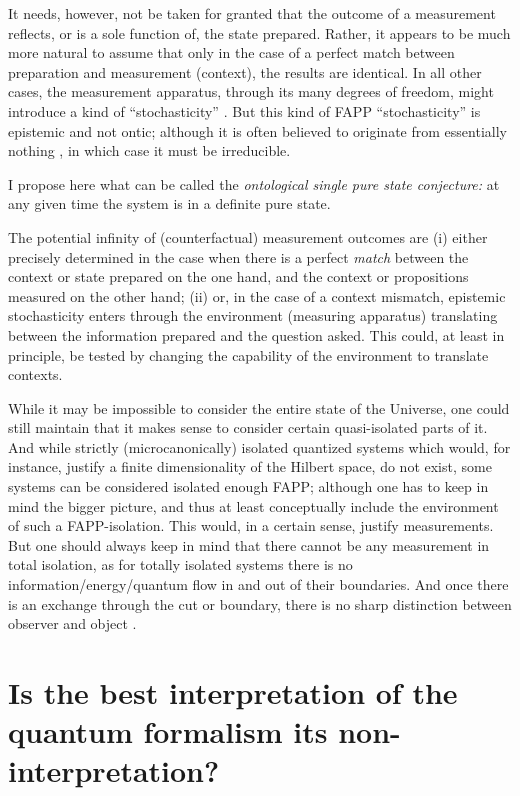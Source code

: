 \documentclass[%
 preprint,
 showpacs,
 showkeys,
 preprintnumbers,
 amsmath,amssymb,
 aps,
  pra,
  longbibliography,
 ]{revtex4-1}
\begin{document}
It needs, however, not be taken for granted that the outcome of a measurement
reflects, or is a sole function of, the state prepared.
Rather, it appears to be much more natural to assume that only in the case of a
perfect match between preparation and measurement (context), the results are identical.
In all other cases, the measurement apparatus, through its many degrees of freedom,
might introduce a kind of ``stochasticity''
\cite{svozil-2003-garda,svozil-2011-jesuitlies}.
But this kind of FAPP ``stochasticity'' is epistemic and not ontic;
although it is often believed to originate from
essentially nothing \cite{zeil-99,zeil-05_nature_ofQuantum}, in which case it must be irreducible.


I propose here what can be called the {\em ontological single pure state conjecture:}
at any given time the system is in a definite pure state.

The potential infinity of (counterfactual) measurement outcomes
are (i) either precisely determined in the case when there is a perfect {\em match} between the context or state prepared on the one hand,
and the context or propositions measured on the other hand;
(ii) or, in the case of a context mismatch, epistemic stochasticity enters through the environment (measuring apparatus)
translating \cite{svozil-2003-garda} between the information prepared and the question asked.
This could, at least in principle, be tested by changing the capability of the environment to translate contexts.

While it may be impossible to consider the entire state of the Universe,
one could still maintain that it makes sense to consider certain quasi-isolated parts of it.
And while strictly (microcanonically) isolated quantized systems which would, for instance,
justify a finite dimensionality of the Hilbert space,
do not exist, some systems can be considered isolated enough FAPP; although one has to keep in mind the bigger picture, and thus
at least conceptually include the environment of such a FAPP-isolation.
This would, in a certain sense, justify measurements.
But one should always keep in mind that there cannot be any measurement in total isolation, as
for totally isolated systems there is no information/energy/quantum flow in and out of their boundaries.
And once there is an exchange through the cut or boundary,
there is no sharp distinction between observer and object
\cite{svozil-2001-convention}.



\section{Is the best interpretation of the quantum formalism its non-interpretation?}
\end{document}
